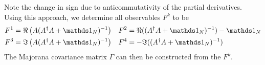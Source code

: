 \documentclass[letter]{article}
\begin{document}
Note the change in sign due to anticommutativity of the partial derivatives.
Using this approach, we determine all observables $F^k$ to be 
\begin{align}
F^1 &= \Re\left( A (A^\dagger A + \id_N)^{-1} \right) &
F^2 &= \Re((A^\dagger A + \id_N)^{-1}) - \id_N \\
F^3 &= \Im\left( A (A^\dagger A + \id_N)^{-1} \right) &
F^4 &= -\Im((A^\dagger A + \id_N)^{-1})
\end{align}
The Majorana covariance matrix $\Gamma$ can then be constructed from the $F^k$.
\end{document}
